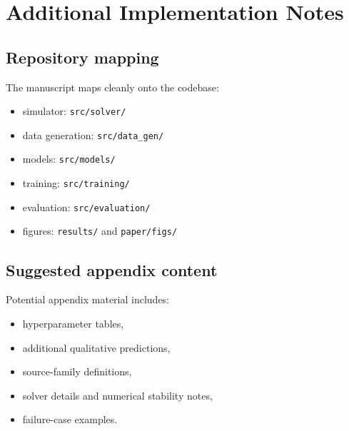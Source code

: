 \section{Additional Implementation Notes}

\subsection{Repository mapping}

The manuscript maps cleanly onto the codebase:
\begin{itemize}[leftmargin=1.5em]
    \item simulator: \texttt{src/solver/}
    \item data generation: \texttt{src/data\_gen/}
    \item models: \texttt{src/models/}
    \item training: \texttt{src/training/}
    \item evaluation: \texttt{src/evaluation/}
    \item figures: \texttt{results/} and \texttt{paper/figs/}
\end{itemize}

\subsection{Suggested appendix content}

Potential appendix material includes:
\begin{itemize}[leftmargin=1.5em]
    \item hyperparameter tables,
    \item additional qualitative predictions,
    \item source-family definitions,
    \item solver details and numerical stability notes,
    \item failure-case examples.
\end{itemize}
